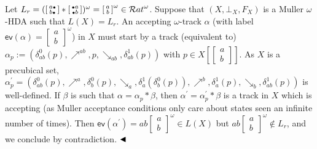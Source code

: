 \documentclass[10pt,a4paper]{article}
\begin{document}
Let $L_{r}=(\left[\begin{smallmatrix}a\vbox{\hbox{\tiny$\bullet$}}\\
b\vbox{\hbox{\tiny$\bullet$}}\end{smallmatrix}\right]*\left[\begin{smallmatrix}\vbox{\hbox{\tiny$\bullet$}}a\\
\vbox{\hbox{\tiny$\bullet$}}b\end{smallmatrix}\right])^{\omega}=\left[\begin{smallmatrix}a\\
b\end{smallmatrix}\right]^{\omega}\in{\mathcal{R}at}^{\omega}$. Suppose that $(X,\bot_{X},F_{X})$ is a Muller $\omega$-HDA such that $L(X)=L_{r}$. An accepting $\omega$-track $\alpha$ (with label $\mathsf{ev}(\alpha)=\left[\begin{smallmatrix}a\\
b\end{smallmatrix}\right]^{\omega}$) in $X$ must start by a track (equivalent to) $\alpha_{p}:=(\delta^{0}_{ab}(p),\mathrel{\nearrow^{ab}},p,\mathrel{\searrow_{ab}},\delta^{1}_{ab}(p))$ with $p\in X[\left[\begin{smallmatrix}a\\
b\end{smallmatrix}\right]]$. As $X$ is a precubical set, $\alpha^{\prime}_{p}=(\delta^{0}_{ab}(p),\mathrel{\nearrow^{a}},\delta^{0}_{b}(p),\mathrel{\searrow_{a}},\delta^{1}_{a}(\delta^{0}_{b}(p)),\mathrel{\nearrow^{b}},\delta^{1}_{a}(p),\mathrel{\searrow_{b}},\delta^{1}_{ab}(p))$ is well-defined. If $\beta$ is such that $\alpha=\alpha_{p}*\beta$, then $\alpha^{\prime}=\alpha^{\prime}_{p}*\beta$ is a track in $X$ which is accepting (as Muller acceptance conditions only care about states seen an infinite number of times). Then $\mathsf{ev}(\alpha^{\prime})=ab\left[\begin{smallmatrix}a\\
b\end{smallmatrix}\right]^{\omega}\in L(X)$ but $ab\left[\begin{smallmatrix}a\\
b\end{smallmatrix}\right]^{\omega}\not\in L_{r}$, and we conclude by contradiction. $\hfill\blacktriangleleft$\par
 
 
 
\end{document}

